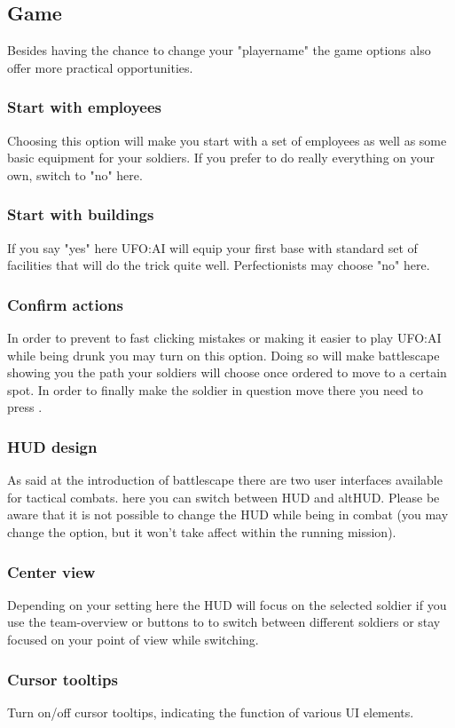 \subsection{Game}
Besides having the chance to change your "playername" the game options also offer more practical opportunities.
\subsubsection*{Start with employees}
Choosing this option will make you start with a set of employees as well as some basic equipment for your soldiers. If you prefer to do really everything on your own, switch to "no" here.
\subsubsection*{Start with buildings}
If you say "yes" here UFO:AI will equip your first base with standard set of facilities that will do the trick quite well. Perfectionists may choose "no" here.
\subsubsection*{Confirm actions}
In order to prevent to fast clicking mistakes or making it easier to play UFO:AI while being drunk you may turn on this option. Doing so will make battlescape showing you the path your soldiers will choose once ordered to move to a certain spot. In order to finally make the soldier in question move there you need to press .
\subsubsection*{HUD design}
As said at the introduction of battlescape there are two user interfaces available for tactical combats. here you can switch between HUD and altHUD. Please be aware that it is not possible to change the HUD while being in combat (you may change the option, but it won't take affect within the running mission).
\subsubsection*{Center view}
Depending on your setting here the HUD will focus on the selected soldier if you use the team-overview or buttons  to  to switch between different soldiers or stay focused on your point of view while switching.
\subsubsection*{Cursor tooltips}
Turn on/off cursor tooltips, indicating the function of various UI elements.
